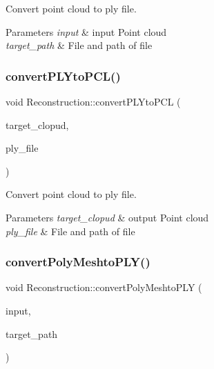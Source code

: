 Convert point cloud to ply file. 


\begin{DoxyParams}{Parameters}
{\em input} & input Point cloud \\
\hline
{\em target\+\_\+path} & File and path of file \\
\hline
\end{DoxyParams}
\mbox{\label{classReconstruction_a46cab918422a3c74bced403043968992}} 
\subsubsection{\texorpdfstring{convert\+P\+L\+Yto\+P\+C\+L()}{convertPLYtoPCL()}}
{\footnotesize\ttfamily void Reconstruction\+::convert\+P\+L\+Yto\+P\+CL (\begin{DoxyParamCaption}\item[{pcl\+::\+Point\+Cloud$<$ pcl\+::\+Point\+X\+Y\+Z\+R\+G\+B\+Normal $>$\+::Ptr \&}]{target\+\_\+clopud,  }\item[{std\+::string}]{ply\+\_\+file }\end{DoxyParamCaption})}



Convert point cloud to ply file. 


\begin{DoxyParams}{Parameters}
{\em target\+\_\+clopud} & output Point cloud \\
\hline
{\em ply\+\_\+file} & File and path of file \\
\hline
\end{DoxyParams}
\mbox{\label{classReconstruction_afab7e493f5aee46722977acd64658c7a}} 
\subsubsection{\texorpdfstring{convert\+Poly\+Meshto\+P\+L\+Y()}{convertPolyMeshtoPLY()}}
{\footnotesize\ttfamily void Reconstruction\+::convert\+Poly\+Meshto\+P\+LY (\begin{DoxyParamCaption}\item[{pcl\+::\+Polygon\+Mesh\+::\+Ptr \&}]{input,  }\item[{std\+::string}]{target\+\_\+path }\end{DoxyParamCaption})}



